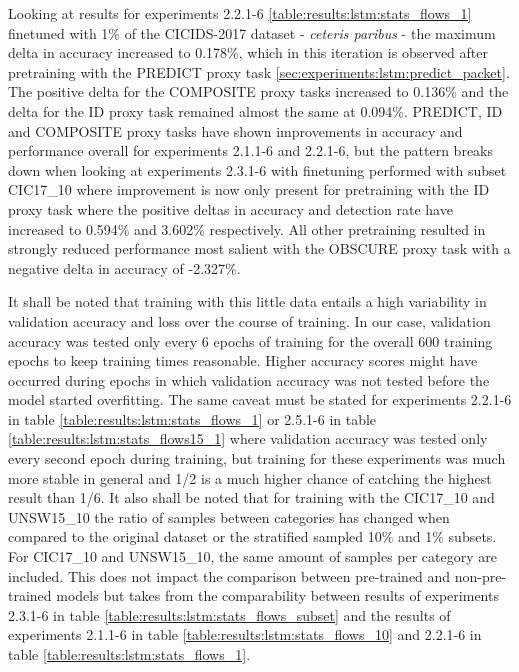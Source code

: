 Looking at results for experiments 2.2.1-6 \ref{table:results:lstm:stats_flows_1} finetuned with 1\% of the CICIDS-2017 dataset - \textit{ceteris paribus} - the maximum delta in accuracy increased to 0.178\%, which in this iteration is observed after pretraining with the PREDICT proxy task \ref{sec:experiments:lstm:predict_packet}. The positive delta for the COMPOSITE proxy tasks increased to 0.136\% and the delta for the ID proxy task remained almost the same at 0.094\%. PREDICT, ID and COMPOSITE proxy tasks have shown improvements in accuracy and performance overall for experiments 2.1.1-6 and 2.2.1-6, but the pattern breaks down when looking at experiments 2.3.1-6 with finetuning performed with subset CIC17\_10 where improvement is now only present for pretraining with the ID proxy task where the positive deltas in accuracy and detection rate have increased to 0.594\% and 3.602\% respectively. All other pretraining resulted in strongly reduced performance most salient with the OBSCURE proxy task with a negative delta in accuracy of -2.327\%. \par 
It shall be noted that training with this little data entails a high variability in validation accuracy and loss over the course of training. In our case, validation accuracy was tested only every 6 epochs of training for the overall 600 training epochs to keep training times reasonable. Higher accuracy scores might have occurred during
epochs in which validation accuracy was not tested before the model started overfitting. The same caveat must be stated for experiments 2.2.1-6 in table \ref{table:results:lstm:stats_flows_1} or 2.5.1-6 in table \ref{table:results:lstm:stats_flows15_1} where validation accuracy was tested only every second epoch during training, but training for these experiments was much more stable in general and 1/2 is a much higher chance of catching the highest result than 1/6. It also shall be noted that for training with the CIC17\_10 and UNSW15\_10 the ratio of samples between categories has changed when compared to the original dataset or the stratified sampled 10\% and 1\% subsets. For CIC17\_10 and UNSW15\_10, the same amount of samples per category are included. This does not impact the comparison between pre-trained and non-pre-trained models but takes from the comparability between results of experiments 2.3.1-6 in table \ref{table:results:lstm:stats_flows_subset} and the results of experiments 2.1.1-6 in table \ref{table:results:lstm:stats_flows_10} and 2.2.1-6 in table \ref{table:results:lstm:stats_flows_1}. \par
